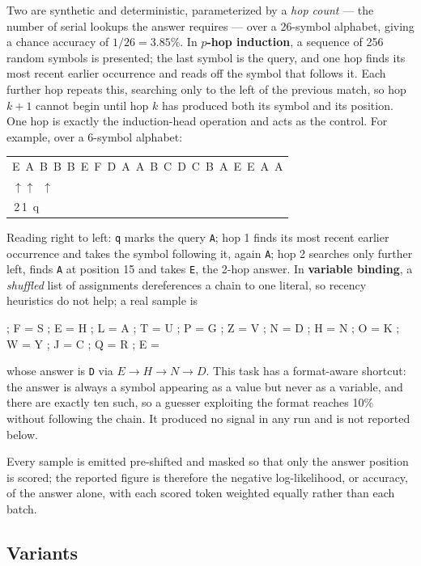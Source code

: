 \documentclass[11pt,a4paper]{article}
\begin{document}
Two are synthetic and deterministic, parameterized by a \emph{hop count} --- the number of serial
lookups the answer requires --- over a 26-symbol alphabet, giving a chance accuracy of
$1/26 = 3.85\%$. In \textbf{$p$-hop induction}, a sequence of 256 random symbols is presented; the
last symbol is the query, and one hop finds its most recent earlier occurrence and reads off the
symbol that follows it. Each further hop repeats this, searching only to the left of the previous
match, so hop $k+1$ cannot begin until hop $k$ has produced both its symbol and its position. One
hop is exactly the induction-head operation and acts as the control. For example, over a 6-symbol
alphabet:
\begin{center}
\begin{tabular}{@{}l@{}}
\ttfamily E~A~B~B~B~E~F~D~A~A~B~C~D~C~B~A~E~E~A~A \\[-0.2em]
\ttfamily \phantom{E~A~B~B~B~E~F~D~A~A~B~C~D~C~B~}$\uparrow$\phantom{A~E~}$\uparrow$~$\uparrow$ \\[-0.2em]
\ttfamily \phantom{E~A~B~B~B~E~F~D~A~A~B~C~D~C~B~}\,2\phantom{A~E~}\,1~q \\
\end{tabular}
\end{center}
Reading right to left: \texttt{q} marks the query \texttt{A}; hop 1 finds its most recent earlier
occurrence and takes the symbol following it, again \texttt{A}; hop 2 searches only further left,
finds \texttt{A} at position 15 and takes \texttt{E}, the 2-hop answer. In \textbf{variable binding}, a
\emph{shuffled} list of assignments dereferences a chain to one literal, so recency heuristics do
not help; a real sample is
\begin{center}
\ttfamily ; F = S ; E = H ; L = A ; T = U ; P = G ; Z = V ; N = D ; H = N ; O = K ; W = Y ; J = C ; Q = R ; E =
\end{center}
whose answer is \texttt{D} via $E \to H \to N \to D$. This task has a format-aware shortcut: the
answer is always a symbol appearing as a value but never as a variable, and there are exactly ten
such, so a guesser exploiting the format reaches 10\% without following the chain. It produced no
signal in any run and is not reported below.

Every sample is emitted pre-shifted and masked so that only the answer position is scored; the
reported figure is therefore the negative log-likelihood, or accuracy, of the answer alone, with
each scored token weighted equally rather than each batch.

\subsection{Variants}
\end{document}
